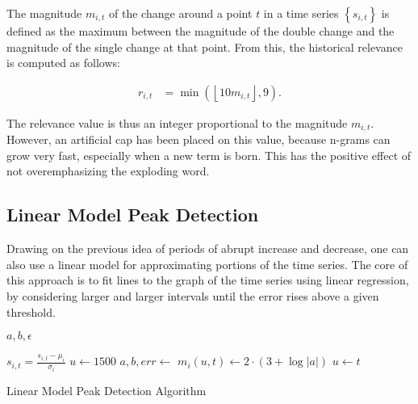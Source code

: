 The magnitude $m_{i, t}$ of the change around a point $t$ in a time series $\left\{ s_{i, t} \right\}$ is defined as the maximum between the magnitude of the double change and the magnitude of the single change at that point. From this, the historical relevance is computed as follows:

\begin{align}
\label{eq:double-change-relevance}
r_{i, t} &= \min \left( \left\lfloor 10 m_{i, t} \right\rfloor, 9 \right).
\end{align}

The relevance value is thus an integer proportional to the magnitude $m_{i, t}$. However, an artificial cap has been placed on this value, because n-grams can grow very fast, especially when a new term is born. This has the positive effect of not overemphasizing the exploding word.

\subsection{Linear Model Peak Detection}
\label{subsec:linear-model-peak}

Drawing on the previous idea of periods of abrupt increase and decrease, one can also use a linear model for approximating portions of the time series. The core of this approach is to fit lines to the graph of the time series using linear regression, by considering larger and larger intervals until the error rises above a given threshold.

\begin{algorithm}

\begin{algorithmic}[1]
    \State \Return $a, b, \epsilon$
\EndFunction
\item[]
        \State $s_{i, t} = \frac{s_{i, t} - \mu_i}{\sigma_i}$
    \EndFor
\EndFor
{}
    \State $u \gets 1500$
        \State $a, b, err \gets$ 
            \State $m_i \left( u, t \right) \gets 2 \cdot \left( 3 + \log \left| a \right| \right)$
            \State $u \gets t$
        \EndIf
    \EndFor
\EndFor
\end{algorithmic}

\caption{Linear Model Peak Detection Algorithm}
\label{alg:linear-model}

\end{algorithm}


